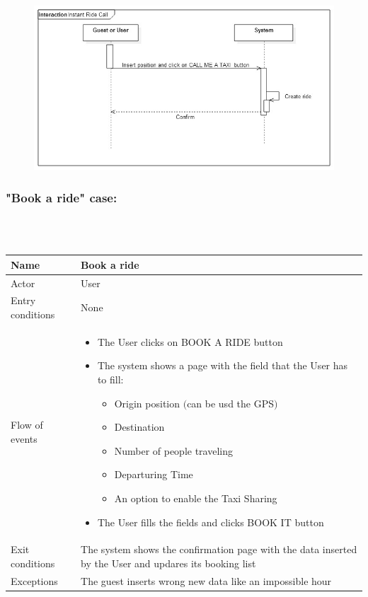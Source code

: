 \begin{figure}[h!]
	\centering
	\includegraphics[height=0.4\textheight]{"myTaxiServiceImg/SequenceDiagram/Instant Ride Call"}
\end{figure}


\newpage
\subsubsection{"Book a ride" case:}
\hfill \\
\\
\begin{tabular}{|p{3cm}|p{10cm}|}
\hline
Name & Book a ride\\
\hline
Actor & User\\
\hline
Entry conditions & None\\
\hline
Flow of events &
	\begin{itemize}
		\item The User clicks on BOOK A RIDE button
		\item The system shows a page with the field that the User has to fill:
		\begin{itemize}
			\item Origin position $($can be usd the GPS$)$
			\item Destination
			\item Number of people traveling
			\item Departuring Time
			\item An option to enable the Taxi Sharing
		\end{itemize}
		\item The User fills the fields and clicks BOOK IT button
	\end{itemize}\\
\hline
Exit conditions & The system shows the confirmation page with the data inserted by the User and updares its booking list\\
\hline
Exceptions & The guest inserts wrong new data like an impossible hour\\
\hline
\end {tabular}

